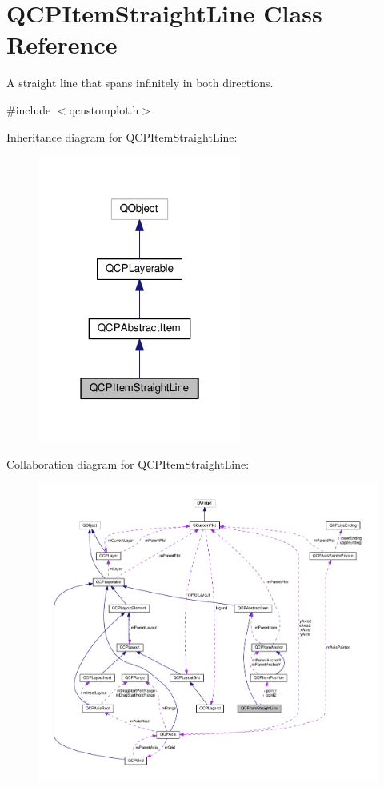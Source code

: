 \hypertarget{classQCPItemStraightLine}{}\section{Q\+C\+P\+Item\+Straight\+Line Class Reference}
\label{classQCPItemStraightLine}


A straight line that spans infinitely in both directions.  




{\ttfamily \#include $<$qcustomplot.\+h$>$}



Inheritance diagram for Q\+C\+P\+Item\+Straight\+Line\+:
\nopagebreak
\begin{figure}[H]
\begin{center}
\leavevmode
\includegraphics[width=190pt]{classQCPItemStraightLine__inherit__graph}
\end{center}
\end{figure}


Collaboration diagram for Q\+C\+P\+Item\+Straight\+Line\+:
\nopagebreak
\begin{figure}[H]
\begin{center}
\leavevmode
\includegraphics[width=350pt]{classQCPItemStraightLine__coll__graph}
\end{center}
\end{figure}
